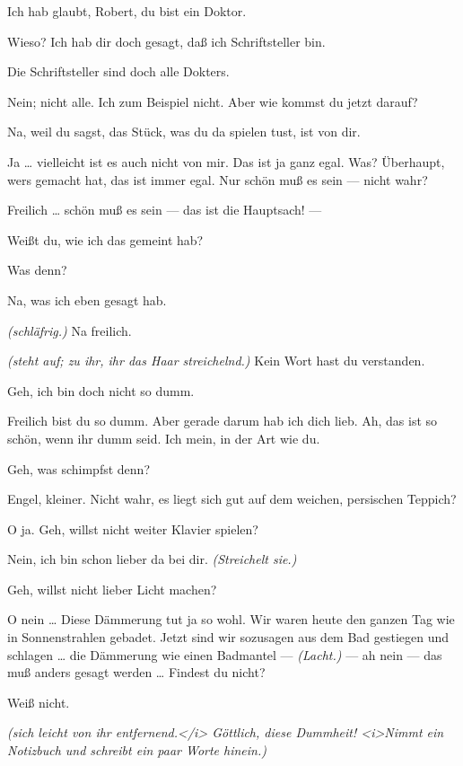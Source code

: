 \documentclass[
	final,
	a4paper,
	ngerman,
	mpinclude = true, %
	twoside = true,
	open = right,
	cleardoublepage = plain,
	DIV = 13,
	BCOR = 1cm,
	titlepage = firstiscover,
	]{scrbook}
\newcommand{\direction}[1]{\textit{(#1)}}
\newcommand{\thecharacter}[1]{\textup{\textsc{#1}}}
\newcommand{\thesuesse}{\thecharacter{Süßes Mädel}}
\newcommand{\thedichter}{\thecharacter{Dichter}}
\newcommand{\character}[1]{\item[#1:]}
\newcommand{\suesse}{\character{\thesuesse}}
\newcommand{\dichter}{\character{\thedichter}}
\begin{document}
\begin{play}
	\suesse
	Ich hab glaubt, Robert, du bist ein Doktor.

	\dichter
	Wieso? Ich hab dir doch gesagt, daß ich Schriftsteller bin.

	\suesse
	Die Schriftsteller sind doch alle Dokters.

	\dichter
	Nein; nicht alle. Ich zum Beispiel nicht. Aber wie kommst du jetzt darauf?

	\suesse
	Na, weil du sagst, das Stück, was du da spielen tust, ist von dir.

	\dichter
	Ja \ldots{} vielleicht ist es auch nicht von mir. Das ist ja ganz egal. Was? Überhaupt, wers gemacht hat, das ist immer egal. Nur schön muß es sein --- nicht wahr?

	\suesse
	Freilich \ldots{} schön muß es sein --- das ist die Hauptsach! ---

	\dichter
	Weißt du, wie ich das gemeint hab?

	\suesse
	Was denn?

	\dichter
	Na, was ich eben gesagt hab.

	\suesse
	\direction{schläfrig.} Na freilich.

	\dichter
	\direction{steht auf; zu ihr, ihr das Haar streichelnd.} Kein Wort hast du verstanden.

	\suesse
	Geh, ich bin doch nicht so dumm.

	\dichter
	Freilich bist du so dumm. Aber gerade darum hab ich dich lieb. Ah, das ist so schön, wenn ihr dumm seid. Ich mein, in der Art wie du.

	\suesse
	Geh, was schimpfst denn?

	\dichter
	Engel, kleiner. Nicht wahr, es liegt sich gut auf dem weichen, persischen Teppich?

	\suesse
	O ja. Geh, willst nicht weiter Klavier spielen?

	\dichter
	Nein, ich bin schon lieber da bei dir. \direction{Streichelt sie.}

	\suesse
	Geh, willst nicht lieber Licht machen?

	\dichter
	O nein \ldots{} Diese Dämmerung tut ja so wohl. Wir waren heute den ganzen Tag wie in Sonnenstrahlen gebadet. Jetzt sind wir sozusagen aus dem Bad gestiegen und schlagen \ldots{} die Dämmerung wie einen Badmantel --- \direction{Lacht.} --- ah nein --- das muß anders gesagt werden \ldots{} Findest du nicht?

	\suesse
	Weiß nicht.

	\dichter
	\direction{sich leicht von ihr entfernend.</i> Göttlich, diese Dummheit! <i>Nimmt ein Notizbuch und schreibt ein paar Worte hinein.}


\end{play}
\end{document}

